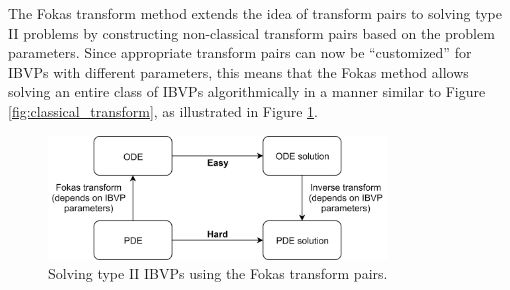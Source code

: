 \documentclass[12pt, oneside, a4paper]{article}
\begin{document}
The Fokas transform method \cite{Fokas2008} extends the idea of transform pairs to solving type II problems by constructing non-classical transform pairs based on the problem parameters. Since appropriate transform pairs can now be ``customized'' for IBVPs with different parameters, this means that the Fokas method allows solving an entire class of IBVPs algorithmically in a manner similar to Figure \ref{fig:classical_transform}, as illustrated in Figure \ref{fig:fokas_transform}.
\begin{figure}[htpb!]
    \centering
    \includegraphics[width=0.8\textwidth]{fokas_transform.png}
    \caption{Solving type II IBVPs using the Fokas transform pairs.}
    \label{fig:fokas_transform}
\end{figure}
\end{document}
